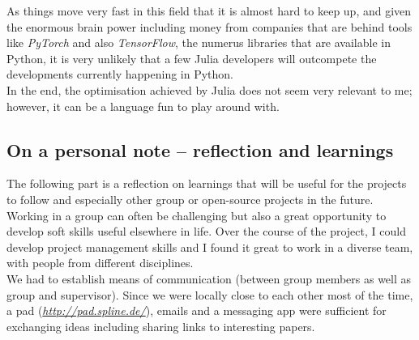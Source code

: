 \documentclass[journal, a4paper]{IEEEtran}
\begin{document}
As things move very fast in this field that it is almost hard to keep up, and given the enormous brain power including money from companies that are behind tools like \textit{PyTorch} and also \textit{TensorFlow}, the numerus libraries that are available in Python, it is very unlikely that a few Julia developers will outcompete the developments currently happening in Python. \\

In the end, the optimisation achieved by Julia does not seem very relevant to me; however, it can be a language fun to play around with.




\subsection{\textbf{On a personal note -- reflection and learnings}}



The following part is a reflection on learnings that will be useful for the projects to follow and especially other group or open-source projects in the future.\\


Working in a group can often be challenging but also a great opportunity to develop soft skills useful elsewhere in life. Over the course of the project, I could develop project management skills and I found it great to work in a diverse team, with people from different disciplines. \\
We had to establish means of communication (between group members as well as group and supervisor). Since we were locally close to each other most of the time, a pad (\textit{\url{http://pad.spline.de/}}), emails and a messaging app were sufficient for exchanging ideas including sharing links to interesting papers.
\end{document}
